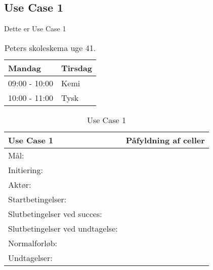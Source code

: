 \subsection{Use Case 1}
Dette er Use Case 1

\begin{table}[htbp]
\centering
\begin{tabular}{|l|l|} %
\hline
Mandag & Tirsdag  \\\hline
09:00 - 10:00 & Kemi  \\\hline
10:00 - 11:00 & Tysk  \\\hline
\end{tabular}
\caption{Peters skoleskema uge 41.}
\end{table} 

\begin{table}[]
\centering
\label{my-label}
\begin{tabular}{|l|l|}
\hline
\textbf{Use Case 1  }           & \textbf{Påfyldning af celler} \\ \hline
Mål:                            &                            \\ \hline
Initiering:                     &                            \\ \hline
Aktør:                          &                            \\ \hline
Startbetingelser:               &                            \\ \hline
Slutbetingelser ved succes:     &                            \\ \hline
Slutbetingelser ved undtagelse: &                            \\ \hline
Normalforløb:                   &                            \\ \hline
Undtagelser:                    &                            \\ \hline
\end{tabular}
\caption{Use Case 1}
\label{tab:uc1}
\end{table}

\begin{table}[]
\centering
{}
\caption{My caption}
\label{my-label}
\end{table}
